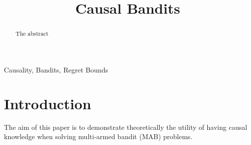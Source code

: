 \documentclass[wcp]{jmlr}
\title[Causal Bandits]{Causal Bandits}
\author{\Name{Author's Name}}
\begin{document}
\maketitle

\begin{abstract}
	The abstract
\end{abstract}
\begin{keywords}
	Causality, Bandits, Regret Bounds
\end{keywords}

\section{Introduction}
\label{sec:intro}

The aim of this paper is to demonstrate theoretically the utility of having 
causal knowledge when solving multi-armed bandit (MAB) problems.
\end{document}

